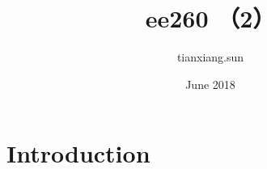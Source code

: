 \documentclass{article}
\title{ee260 （2）}
\author{tianxiang.sun }
\date{June 2018}
\begin{document}
\maketitle

\section{Introduction}
\end{document}
